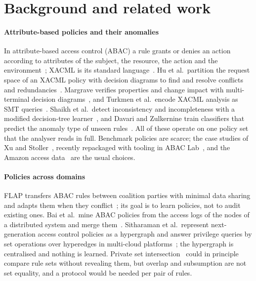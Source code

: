 \documentclass[preprint,12pt]{elsarticle}
\theoremstyle{definition}
\begin{document}
\section{Background and related work}
\label{sec:related}

\paragraph{Attribute-based policies and their anomalies}
In attribute-based access control (ABAC) a rule grants or denies an action according to attributes of the subject, the resource, the action and the environment~\cite{hu2014abac}; XACML is its standard language~\cite{oasis2013xacml}. Hu et al.\ partition the request space of an XACML policy with decision diagrams to find and resolve conflicts and redundancies~\cite{hu2013discovery}. Margrave verifies properties and change impact with multi-terminal decision diagrams~\cite{fisler2005margrave}, and Turkmen et al.\ encode XACML analysis as SMT queries~\cite{turkmen2017formal}. Shaikh et al.\ detect inconsistency and incompleteness with a modified decision-tree learner~\cite{shaikh2017data}, and Davari and Zulkernine train classifiers that predict the anomaly type of unseen rules~\cite{davari2023classification}. All of these operate on one policy set that the analyser reads in full. Benchmark policies are scarce; the case studies of Xu and Stoller~\cite{xu2015mining}, recently repackaged with tooling in ABAC Lab~\cite{bui2025abaclab}, and the Amazon access data~\cite{amazon2013access} are the usual choices.

\paragraph{Policies across domains}
FLAP transfers ABAC rules between coalition parties with minimal data sharing and adapts them when they conflict~\cite{abujabal2020flap}; its goal is to learn policies, not to audit existing ones. Bai et al.\ mine ABAC policies from the access logs of the nodes of a distributed system and merge them~\cite{bai2025enhancing}. Sitharaman et al.\ represent next-generation access control policies as a hypergraph and answer privilege queries by set operations over hyperedges in multi-cloud platforms~\cite{sitharaman2025scalable}; the hypergraph is centralised and nothing is learned. Private set intersection~\cite{freedman2004efficient} could in principle compare rule sets without revealing them, but overlap and subsumption are not set equality, and a protocol would be needed per pair of rules.
\end{document}
